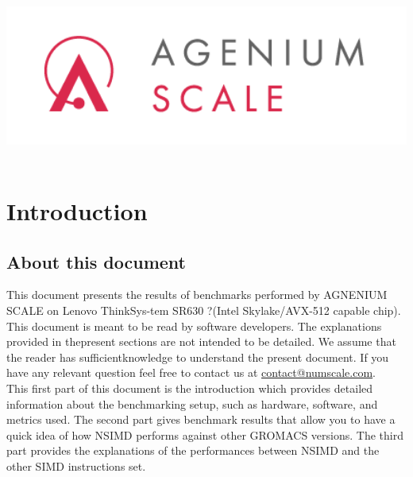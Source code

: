 
\usepackage{listings}
\usepackage{algorithm}
\usepackage{amsmath} 
\usepackage{algorithmic}

\usepackage[T1]{fontenc}
\usepackage[utf8]{inputenc}
\usepackage{multicol}




\title{\includegraphics[width=27em]{tex/scale.png}}

\maketitle
\clearpage
{}

\begin{flushright}\textit{}\end{flushright}


\tableofcontents
\newpage
\section{Introduction} %
	\subsection{About this document}
 This document presents the results of benchmarks performed by AGNENIUM SCALE on Lenovo ThinkSys-tem SR630 ?(Intel Skylake/AVX-512 capable chip).\\
 
	This document is meant to be read by software developers.  The explanations provided in thepresent  sections  are  not  intended  to  be  detailed.   We  assume  that  the  reader  has  sufficientknowledge to understand the present document.  If you have any relevant question feel free to contact us at \href{contact@numscale.com}{contact@numscale.com}. \\
 
 This first part of this document is the introduction which provides detailed information about the benchmarking setup, such as hardware, software, and metrics used.  The second part gives benchmark results that allow you to have a quick idea of how NSIMD performs against other GROMACS versions. The third part provides the explanations of the performances between NSIMD and the other SIMD instructions set.
 
